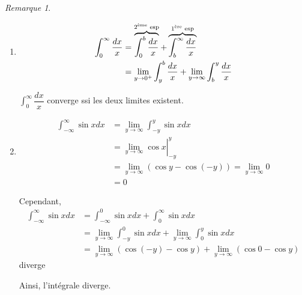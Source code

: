 \documentclass{report}
\theoremstyle{definition}
\theoremstyle{remark}
\newtheorem*{rema}{Remarque}
\begin{document}
	\begin{rema}~

		\begin{enumerate}
			\item \begin{align*}
				\int_{0}^{\infty}\dfrac{dx}{x}&= \overbrace{\int_{0}^{b}\dfrac{dx}{x}}^{\text{2\textsuperscript{\`eme} esp}} + \overbrace{\int_{b}^{\infty}\dfrac{dx}{x}}^{\text{1\textsuperscript{\`ere} esp}}\\
				&= \lim_{y \to 0^+}\int_{y}^{b}\dfrac{dx}{x} + \lim_{y \to \infty}\int_{b}^{y}\dfrac{dx}{x}
			\end{align*}

			$\displaystyle\int_{0}^{\infty}\dfrac{dx}{x}$ converge ssi les deux limites existent.
			\item \begin{align*}
				\int_{-\infty}^{\infty}\sin xdx&= \lim_{y \to \infty}\int_{-y}^{y}\sin xdx\\
				&= \left. \lim_{y \to \infty} \cos x\right|^y_{-y}\\
				&= \lim_{y \to \infty}(\cos y - \cos (-y)) = \lim_{y \to \infty}0\\
				&= 0
			\end{align*}

			Cependant,
			\begin{align*}
				\int_{-\infty}^{\infty}\sin xdx&= \int_{-\infty}^{0}\sin xdx + \int_{0}^{\infty}\sin xdx\\
				&= \lim_{y \to \infty}\int_{-y}^{0}\sin xdx + \lim_{y \to \infty}\int_{0}^{y}\sin xdx\\
				&= \lim_{y \to \infty}(\cos(-y)-\cos y) + \lim_{y \to \infty}(\cos0-\cos y)
			\end{align*}
			diverge

			Ainsi, l'int\'egrale diverge.
		\end{enumerate}
	\end{rema}
\end{document}
